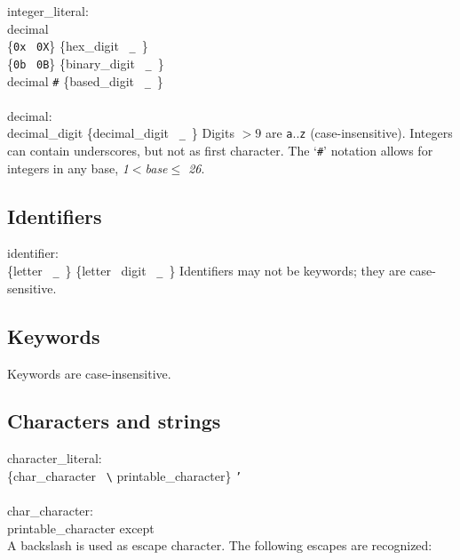 \grammarstart
integer\_literal: \\
       \>decimal \\
\orbox \>\{{\tt{}0x} \orbox \ {\tt{}0X}\} \{hex\_digit \orbox \ {\tt{}\_}\ \}\SERIES \\
\orbox \>\{{\tt{}0b} \orbox \ {\tt{}0B}\} \{binary\_digit \orbox \ {\tt{}\_}\ \}\SERIES \\
\orbox \>decimal {\tt{}\#} \{based\_digit \orbox \ {\tt{}\_}\ \}\SERIES \\
 \\
decimal: \\
      \>decimal\_digit \{decimal\_digit \orbox \ {\tt{}\_}\ \}\SERIESOPT
\grammarend
Digits $>9$ are {\tt{}a}..{\tt{}z} (case-insensitive). Integers can contain underscores,
but not as first character. The `{\tt{}\#}' notation allows for integers in
any base, {\it{}1$<$base$\le$ 26}.

\subsection{Identifiers}\label{sec:idtoken}

\grammarstart
identifier: \\
      \>\{letter \orbox \ {\tt{}\_}\ \} \{letter \orbox \ digit \orbox \ {\tt{}\_}\ \}\SERIESOPT
\grammarend
Identifiers may not be keywords; they are case-sensitive.

\subsection{Keywords}\label{sec:kwtoken}

Keywords are case-insensitive.


\subsection{Characters and strings}\label{sec:idchar}

\grammarstart
character\_literal: \\
       \{char\_character \orbox \ \verb|\| printable\_character\} {\tt{}'} \\
 \\
char\_character: \\
      \>printable\_character except {\tt{}\\}
\grammarend
A backslash is used as escape character. The following escapes are
recognized:

